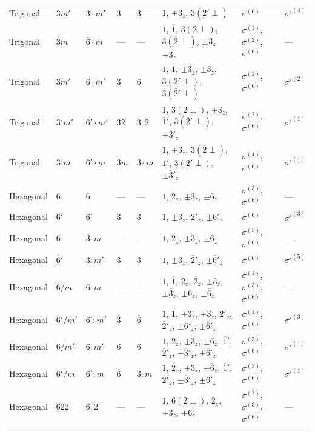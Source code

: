 \documentclass[a4paper,11pt]{article}
\newcommand{\ob}[1]{\overline{#1}}
\newcommand{\sg}[1]{\sigma^{(#1)}}
\newcommand{\sgp}[1]{\sigma'^{(#1)}}
\begin{document}
\begin{landscape}
\begin{longtable}{l l l l l p{9.5cm} l l}
Trigonal & $3m'$ & $3{\cdot}m'$ & $3$ & $3$ & $1$, $\pm 3_z$, $3(\ob{2}'{\perp})$ & $\sg{6}$ & $\sgp{4}$ \\
Trigonal & $\ob{3}m$ & $\ob{6}{\cdot}m$ & --- & --- & $1$, $\ob{1}$, $3(2{\perp})$, $3(\ob{2}{\perp})$, $\pm 3_z$, $\pm\ob{3}_z$ & $\sg{1}$, $\sg{2}$, $\sg{6}$ & --- \\
Trigonal & $\ob{3}m'$ & $\ob{6}{\cdot}m'$ & $\ob{3}$ & $\ob{6}$ & $1$, $\ob{1}$, $\pm 3_z$, $\pm\ob{3}_z$, $3(2'{\perp})$, $3(\ob{2}'{\perp})$ & $\sg{1}$, $\sg{6}$ & $\sgp{2}$ \\
Trigonal & $\ob{3}'m'$ & $\ob{6}'{\cdot}m'$ & $32$ & $3{:}2$ & $1$, $3(2{\perp})$, $\pm 3_z$, $\ob{1}'$, $3(\ob{2}'{\perp})$, $\pm\ob{3}'_z$ & $\sg{2}$, $\sg{6}$ & $\sgp{1}$ \\
Trigonal & $\ob{3}'m$ & $\ob{6}'{\cdot}m$ & $3m$ & $3{\cdot}m$ & $1$, $\pm 3_z$, $3(\ob{2}{\perp})$, $\ob{1}'$, $3(2'{\perp})$, $\pm\ob{3}'_z$ & $\sg{4}$, $\sg{6}$ & $\sgp{1}$ \\
\newpage
Hexagonal & $6$ & $6$ & --- & --- & $1$, $2_z$, $\pm 3_z$, $\pm 6_z$ & $\sg{3}$, $\sg{6}$ & --- \\
Hexagonal & $6'$ & $6'$ & $3$ & $3$ & $1$, $\pm 3_z$, $2'_z$, $\pm 6'_z$ & $\sg{6}$ & $\sgp{3}$ \\
Hexagonal & $\ob{6}$ & $3{:}m$ & --- & --- & $1$, $\ob{2}_z$, $\pm 3_z$, $\pm\ob{6}_z$ & $\sg{5}$, $\sg{6}$ & --- \\
Hexagonal & $\ob{6}'$ & $3{:}m'$ & $3$ & $3$ & $1$, $\pm 3_z$, $\ob{2}'_z$, $\pm\ob{6}'_z$ & $\sg{6}$ & $\sgp{5}$ \\
Hexagonal & $6/m$ & $6{:}m$ & --- & --- & $1$, $\ob{1}$, $2_z$, $\ob{2}_z$, $\pm 3_z$, $\pm\ob{3}_z$, $\pm 6_z$, $\pm\ob{6}_z$ & $\sg{1}$, $\sg{3}$, $\sg{6}$ & --- \\
Hexagonal & $6'/m'$ & $6'{:}m'$ & $\ob{3}$ & $\ob{6}$ & $1$, $\ob{1}$, $\pm 3_z$, $\pm\ob{3}_z$, $2'_z$, $\ob{2}'_z$, $\pm 6'_z$, $\pm\ob{6}'_z$ & $\sg{1}$, $\sg{6}$ & $\sgp{3}$ \\
Hexagonal & $6/m'$ & $6{:}m'$ & $6$ & $6$ & $1$, $2_z$, $\pm 3_z$, $\pm 6_z$, $\ob{1}'$, $\ob{2}'_z$, $\pm\ob{3}'_z$, $\pm\ob{6}'_z$ & $\sg{3}$, $\sg{6}$ & $\sgp{1}$ \\
Hexagonal & $6'/m$ & $6'{:}m$ & $\ob{6}$ & $3{:}m$ & $1$, $\ob{2}_z$, $\pm 3_z$, $\pm\ob{6}_z$, $\ob{1}'$, $2'_z$, $\pm\ob{3}'_z$, $\pm 6'_z$ & $\sg{5}$, $\sg{6}$ & $\sgp{1}$ \\
Hexagonal & $622$ & $6{:}2$ & --- & --- & $1$, $6(2{\perp})$, $2_z$, $\pm 3_z$, $\pm 6_z$ & $\sg{2}$, $\sg{3}$, $\sg{6}$ & --- \\

\end{longtable}
\end{landscape}
\end{document}
